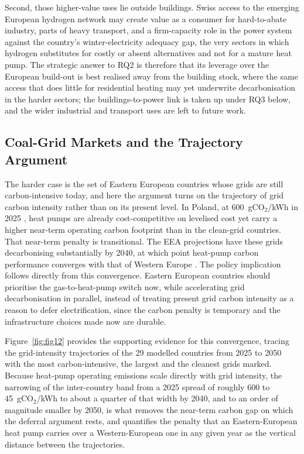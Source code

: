 Second, those higher-value uses lie outside buildings. Swiss access to the emerging
European hydrogen network may create value as a consumer for hard-to-abate industry,
parts of heavy transport, and a firm-capacity role in the power system against the
country's winter-electricity adequacy gap, the very sectors in which hydrogen
substitutes for costly or absent alternatives and not for a mature heat pump. The
strategic answer to RQ2 is therefore that its leverage over the European build-out is
best realised away from the building stock, where the same access that does little for
residential heating may yet underwrite decarbonisation in the harder sectors; the
buildings-to-power link is taken up under RQ3 below, and the wider industrial and
transport uses are left to future work.

\subsection{Coal-Grid Markets and the Trajectory Argument}
\label{sec:discussion:coalgrid} The harder case is the set of Eastern European countries
whose grids are still carbon-intensive today, and here the argument turns on the
trajectory of grid carbon intensity rather than on its present level. In Poland, at 600~gCO$_2$/kWh in 2025
\citep{EMBER2024electricity}, heat pumps are already cost-competitive on levelised cost
yet carry a higher near-term operating carbon footprint than in the clean-grid
countries. That near-term penalty is transitional. The EEA projections have these grids
decarbonising substantially by 2040, at which point heat-pump carbon performance
converges with that of Western Europe \citep{EEA2023fit55}. The policy implication
follows directly from this convergence. Eastern European countries should prioritise the
gas-to-heat-pump switch now, while accelerating grid decarbonisation in parallel,
instead of treating present grid carbon intensity as a reason to defer electrification,
since the carbon penalty is temporary and the infrastructure choices made now are durable.

Figure~\ref{fig:fig12} provides the supporting evidence for this convergence, tracing
the grid-intensity trajectories of the 29 modelled countries from 2025 to 2050 with the
most carbon-intensive, the largest and the cleanest grids marked. Because heat-pump
operating emissions scale directly with grid intensity, the narrowing of the
inter-country band from a 2025 spread of roughly 600 to 45~gCO$_2$/kWh to about a
quarter of that width by 2040, and to an order of magnitude smaller by 2050, is what
removes the near-term carbon gap on which the
deferral argument rests, and quantifies the penalty that an Eastern-European heat pump
carries over a Western-European one in any given year as the vertical distance between
the trajectories.

